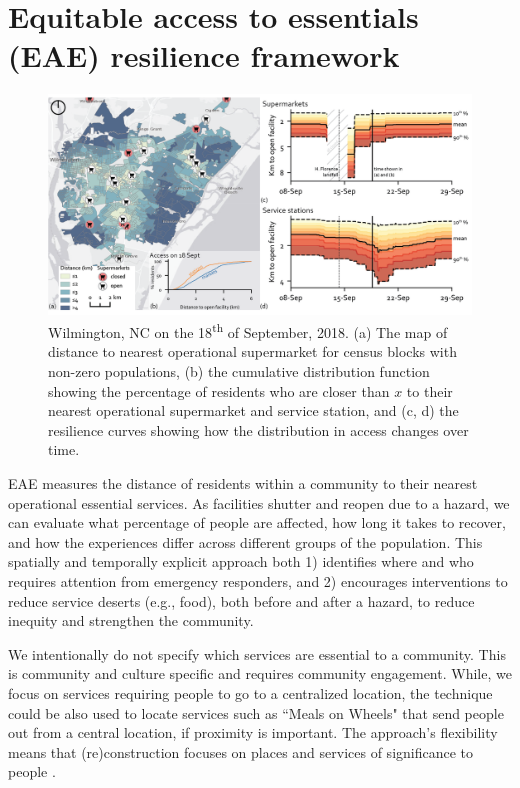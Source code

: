 \documentclass[onecolumn,doublespacing]{risa}
\let \cite \parencite
\begin{document}
\section{Equitable access to essentials (EAE) resilience framework}

\begin{figure}
    \centering
    \includegraphics[width=\linewidth]{report/fig/NC_resilience.png}
    \caption{Wilmington, NC on the 18\textsuperscript{th} of September, 2018. (a) The map of distance to nearest operational supermarket for census blocks with non-zero populations, (b) the cumulative distribution function showing the percentage of residents who are closer than $x$ to their nearest operational supermarket and service station, and (c, d) the resilience curves showing how the distribution in access changes over time.
    }
    \label{fig:fig1}
\end{figure}

EAE measures the distance of residents within a community to their nearest operational essential services. 
As facilities shutter and reopen due to a hazard, we can evaluate what percentage of people are affected, how long it takes to recover, and how the experiences differ across different groups of the population. 
This spatially and temporally explicit approach both 1) identifies where and who requires attention from emergency responders, and 2) encourages interventions to reduce service deserts (e.g., food), both before and after a hazard, to reduce inequity and strengthen the community.

We intentionally do not specify which services are essential to a community.
This is community and culture specific and requires community engagement. 
While, we focus on services requiring people to go to a centralized location, the technique could be also used to locate services such as ``Meals on Wheels" that send people out from a central location, if proximity is important.
The approach's flexibility means that (re)construction focuses on places and services of significance to people \cite{United_Nations_Educational_Scientific_and_Cultural_Organization2018-sf}.
\end{document}

